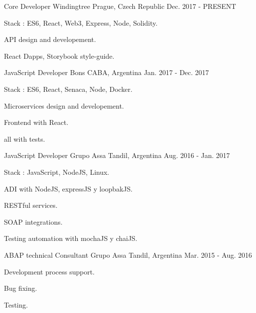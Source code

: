 


\begin{cventries}

\cventry
{ Core Developer} %
{Windingtree} %
{Prague, Czech Republic} %
{Dec. 2017 - PRESENT} %
{ %
\begin{cvitems}
\item {Stack : ES6, React, Web3, Express, Node, Solidity.}
\item {API design and developement.}
\item {React Dapps, Storybook style-guide.}
\end{cvitems}
}
\cventry
{ JavaScript Developer} %
{Bons} %
{CABA, Argentina} %
{Jan. 2017 - Dec. 2017} %
{ %
\begin{cvitems}
\item {Stack : ES6, React, Senaca, Node, Docker.}
\item {Microservices design and developement.}
\item {Frontend with React.}
\item {all with tests.}
\end{cvitems}
}
\cventry
{ JavaScript Developer} %
{Grupo Assa} %
{Tandil, Argentina} %
{Aug. 2016 - Jan. 2017} %
{ %
\begin{cvitems}
\item {Stack : JavaScript, NodeJS, Linux.}
\item {ADI with NodeJS, expressJS y loopbakJS.}
\item {RESTful services.}
\item {SOAP integrations.}
\item {Testing automation with mochaJS y chaiJS.}
\end{cvitems}
}

\cventry
{ABAP technical Consultant} %
{Grupo Assa} %
{Tandil, Argentina} %
{Mar. 2015 - Aug. 2016} %
{ %
\begin{cvitems}
\item {Development process support.}
\item {Bug fixing.}
\item {Testing.}
\end{cvitems}
}

\end{cventries}
